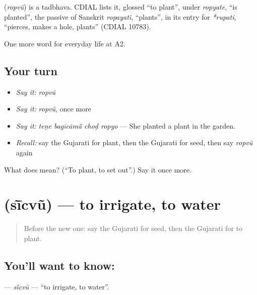 \begin{cousinweb}
\textbf{} (\emph{ropvũ}) is a tadbhava. CDIAL lists it, glossed \textquotedblleft{}to plant\textquotedblright{}, under \emph{ropyate}, \textquotedblleft{}is planted\textquotedblright{}, the passive of Sanskrit \emph{ropayati}, \textquotedblleft{}plants\textquotedblright{}, in its entry for \emph{*rupati}, \textquotedblleft{}pierces, makes a hole, plants\textquotedblright{} (CDIAL 10783).
\end{cousinweb}

\begin{grammarlens}[title={What you've built}]
One more word for everyday life at A2.
\end{grammarlens}

\subsection*{Your turn}
\begin{itemize}
\raggedright
  \item \emph{Say it:} \emph{ropvũ}
  \item \emph{Say it:} \emph{ropvũ}, once more
  \item \emph{Say it:} \emph{teṇe bagīcāmā̃ choḍ ropyo} — She planted a plant in the garden.
  \item \emph{Recall:} say the Gujarati for plant, then the Gujarati for seed, then say \emph{ropvũ} again
\end{itemize}

\begin{tcolorbox}[breakable,colback=teal!4,colframe=teal!35!black,title={Before you move on}]
What does  mean? (\textquotedblleft{}To plant, to set out\textquotedblright{}.) Say it once more.
\end{tcolorbox}
\section[\texorpdfstring{\gu{સીંચવું} (sī̃cvũ)}{સીંચવું (sī̃cvũ)}]{ (sī̃cvũ) — to irrigate, to water}

\label{lesson:GU-C240-sicvu}



\begin{quote}
Before the new one: say the Gujarati for seed, then the Gujarati for to plant.
\end{quote}

\subsection*{You'll want to know: }
\textbf{} — \emph{sī̃cvũ} — \textquotedblleft{}to irrigate, to water\textquotedblright{}.

